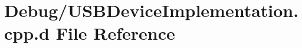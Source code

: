 \hypertarget{_debug_2_u_s_b_device_implementation_8cpp_8d}{\section{\-Debug/\-U\-S\-B\-Device\-Implementation.cpp.\-d \-File \-Reference}
\label{_debug_2_u_s_b_device_implementation_8cpp_8d}
}

